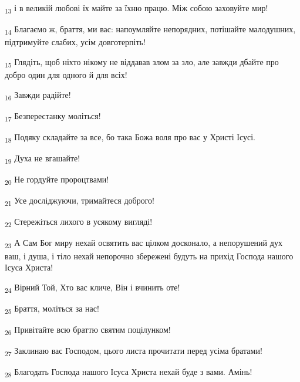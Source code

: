 \begin{tcolorbox}
\textsubscript{13} і в великій любові їх майте за їхню працю. Між собою заховуйте мир!
\end{tcolorbox}
\begin{tcolorbox}
\textsubscript{14} Благаємо ж, браття, ми вас: напоумляйте непорядних, потішайте малодушних, підтримуйте слабих, усім довготерпіть!
\end{tcolorbox}
\begin{tcolorbox}
\textsubscript{15} Глядіть, щоб ніхто нікому не віддавав злом за зло, але завжди дбайте про добро один для одного й для всіх!
\end{tcolorbox}
\begin{tcolorbox}
\textsubscript{16} Завжди радійте!
\end{tcolorbox}
\begin{tcolorbox}
\textsubscript{17} Безперестанку моліться!
\end{tcolorbox}
\begin{tcolorbox}
\textsubscript{18} Подяку складайте за все, бо така Божа воля про вас у Христі Ісусі.
\end{tcolorbox}
\begin{tcolorbox}
\textsubscript{19} Духа не вгашайте!
\end{tcolorbox}
\begin{tcolorbox}
\textsubscript{20} Не гордуйте пророцтвами!
\end{tcolorbox}
\begin{tcolorbox}
\textsubscript{21} Усе досліджуючи, тримайтеся доброго!
\end{tcolorbox}
\begin{tcolorbox}
\textsubscript{22} Стережіться лихого в усякому вигляді!
\end{tcolorbox}
\begin{tcolorbox}
\textsubscript{23} А Сам Бог миру нехай освятить вас цілком досконало, а непорушений дух ваш, і душа, і тіло нехай непорочно збережені будуть на прихід Господа нашого Ісуса Христа!
\end{tcolorbox}
\begin{tcolorbox}
\textsubscript{24} Вірний Той, Хто вас кличе, Він і вчинить оте!
\end{tcolorbox}
\begin{tcolorbox}
\textsubscript{25} Браття, моліться за нас!
\end{tcolorbox}
\begin{tcolorbox}
\textsubscript{26} Привітайте всю браттю святим поцілунком!
\end{tcolorbox}
\begin{tcolorbox}
\textsubscript{27} Заклинаю вас Господом, цього листа прочитати перед усіма братами!
\end{tcolorbox}
\begin{tcolorbox}
\textsubscript{28} Благодать Господа нашого Ісуса Христа нехай буде з вами. Амінь!
\end{tcolorbox}
